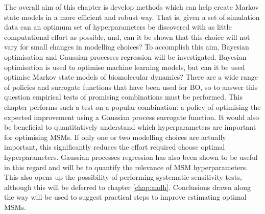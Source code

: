 The overall aim of this chapter is develop methods which can help create Markov state models in a more efficient and robust way. That is, given a set of simulation data can an optimum set of hyperparameters be discovered with as little computational effort as possible, and, can it be shown that this choice will not vary for small changes in modelling choices? To accomplish this aim, Bayesian optimisation and Gaussian processes regression will be investigated. Bayesian optimisation is used to optimise machine learning models, but can it be used optimise Markov state models of biomolecular dynamics?  There are a wide range of policies and surrogate functions that have been used for BO, so to answer this question empirical tests of promising combinations must be performed. This chapter performs such a test on a popular combination: a policy of optimising the expected improvement using a Gaussian process surrogate function.  It would also be beneficial to quantitatively understand which hyperparameters are important for optimising MSMs.  If only one or two modelling choices are actually important, this significantly reduces the effort required choose optimal hyperparameters.  Gaussian processes regression has also been shown to be useful in this regard and will be to quantify the relevance of MSM hyperparameters.  This also opens up the possibility of performing systematic sensitivity tests, although this will be deferred to chapter \ref{chap:aadh}.  Conclusions drawn along the way will be used to suggest practical steps to improve estimating optimal MSMs.  



